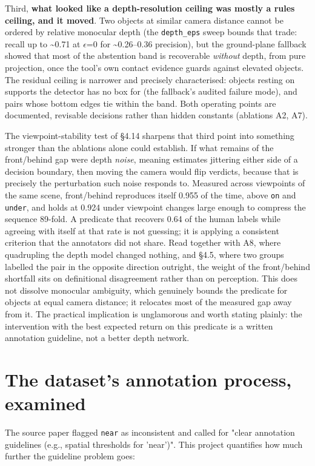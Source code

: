 Third, \textbf{what looked like a depth-resolution ceiling was mostly a rules ceiling, and it moved}. Two objects at similar camera distance cannot be ordered by relative monocular depth (the \texttt{depth\_eps} sweep bounds that trade: recall up to \textasciitilde{}0.71 at $\epsilon$=0 for \textasciitilde{}0.26--0.36 precision), but the ground-plane fallback showed that most of the abstention band is recoverable \textit{without} depth, from pure projection, once the tool's own contact evidence guards against elevated objects. The residual ceiling is narrower and precisely characterised: objects resting on supports the detector has no box for (the fallback's audited failure mode), and pairs whose bottom edges tie within the band. Both operating points are documented, revisable decisions rather than hidden constants (ablations A2, A7).

The viewpoint-stability test of \S4.14 sharpens that third point into something stronger than the ablations alone could establish. If what remains of the front/behind gap were depth \textit{noise}, meaning estimates jittering either side of a decision boundary, then moving the camera would flip verdicts, because that is precisely the perturbation such noise responds to. Measured across viewpoints of the same scene, front/behind reproduces itself 0.955 of the time, above \texttt{on} and \texttt{under}, and holds at 0.924 under viewpoint changes large enough to compress the sequence 89-fold. A predicate that recovers 0.64 of the human labels while agreeing with itself at that rate is not guessing; it is applying a consistent criterion that the annotators did not share. Read together with A8, where quadrupling the depth model changed nothing, and \S4.5, where two groups labelled the pair in the opposite direction outright, the weight of the front/behind shortfall sits on definitional disagreement rather than on perception. This does not dissolve monocular ambiguity, which genuinely bounds the predicate for objects at equal camera distance; it relocates most of the measured gap away from it. The practical implication is unglamorous and worth stating plainly: the intervention with the best expected return on this predicate is a written annotation guideline, not a better depth network.

\section{The dataset's annotation process, examined}

The source paper flagged \texttt{near} as inconsistent and called for "clear annotation guidelines (e.g., spatial thresholds for 'near')". This project quantifies how much further the guideline problem goes:

